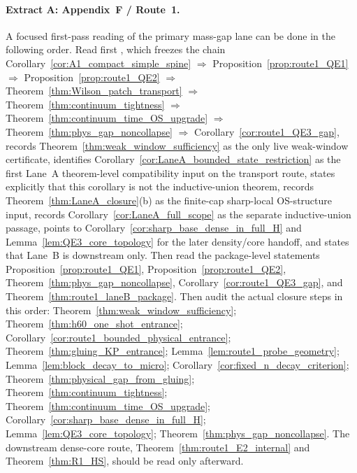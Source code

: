\paragraph{Extract A: Appendix~F / Route~1.}
A focused first-pass reading of the primary mass-gap lane can be done in the following order.
Read first , which freezes the chain Corollary~\ref{cor:A1_compact_simple_spine} $\Rightarrow$ Proposition~\ref{prop:route1_QE1} $\Rightarrow$ Proposition~\ref{prop:route1_QE2} $\Rightarrow$ Theorem~\ref{thm:Wilson_patch_transport} $\Rightarrow$ Theorem~\ref{thm:continuum_tightness} $\Rightarrow$ Theorem~\ref{thm:continuum_time_OS_upgrade} $\Rightarrow$ Theorem~\ref{thm:phys_gap_noncollapse} $\Rightarrow$ Corollary~\ref{cor:route1_QE3_gap}, records Theorem~\ref{thm:weak_window_sufficiency} as the only live weak-window certificate, identifies Corollary~\ref{cor:LaneA_bounded_state_restriction} as the first Lane~A theorem-level compatibility input on the transport route, states explicitly that this corollary is not the inductive-union theorem, records Theorem~\ref{thm:LaneA_closure}(b) as the finite-cap sharp-local OS-structure input, records Corollary~\ref{cor:LaneA_full_scope} as the separate inductive-union passage, points to Corollary~\ref{cor:sharp_base_dense_in_full_H} and Lemma~\ref{lem:QE3_core_topology} for the later density/core handoff, and states that Lane~B is downstream only.
Then read the package-level statements Proposition~\ref{prop:route1_QE1}, Proposition~\ref{prop:route1_QE2}, Theorem~\ref{thm:phys_gap_noncollapse}, Corollary~\ref{cor:route1_QE3_gap}, and Theorem~\ref{thm:route1_laneB_package}.
Then audit the actual closure steps in this order:
Theorem~\ref{thm:weak_window_sufficiency};
Theorem~\ref{thm:h60_one_shot_entrance};
Corollary~\ref{cor:route1_bounded_physical_entrance};
Theorem~\ref{thm:gluing_KP_entrance};
Lemma~\ref{lem:route1_probe_geometry};
Lemma~\ref{lem:block_decay_to_micro};
Corollary~\ref{cor:fixed_n_decay_criterion};
Theorem~\ref{thm:physical_gap_from_gluing};
Theorem~\ref{thm:continuum_tightness};
Theorem~\ref{thm:continuum_time_OS_upgrade};
Corollary~\ref{cor:sharp_base_dense_in_full_H};
Lemma~\ref{lem:QE3_core_topology};
Theorem~\ref{thm:phys_gap_noncollapse}.
The downstream dense-core route, Theorem~\ref{thm:route1_E2_internal} and Theorem~\ref{thm:R1_HS}, should be read only afterward.


